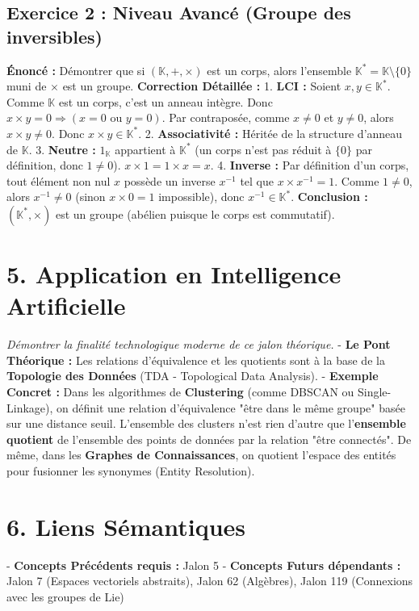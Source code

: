 \documentclass{report}
\begin{document}
\subsection*{Exercice 2 : Niveau Avancé (Groupe des inversibles)}
\textbf{Énoncé :} Démontrer que si $(\mathbb{K}, +, \times)$ est un corps, alors l'ensemble $\mathbb{K}^* = \mathbb{K} \setminus \{0\}$ muni de $\times$ est un groupe.
\textbf{Correction Détaillée :}
1. \textbf{LCI :} Soient $x, y \in \mathbb{K}^*$. Comme $\mathbb{K}$ est un corps, c'est un anneau intègre. Donc $x \times y = 0 \Rightarrow (x = 0 \text{ ou } y = 0)$. Par contraposée, comme $x \neq 0$ et $y \neq 0$, alors $x \times y \neq 0$. Donc $x \times y \in \mathbb{K}^*$.
2. \textbf{Associativité :} Héritée de la structure d'anneau de $\mathbb{K}$.
3. \textbf{Neutre :} $1_{\mathbb{K}}$ appartient à $\mathbb{K}^*$ (un corps n'est pas réduit à $\{0\}$ par définition, donc $1 \neq 0$). $x \times 1 = 1 \times x = x$.
4. \textbf{Inverse :} Par définition d'un corps, tout élément non nul $x$ possède un inverse $x^{-1}$ tel que $x \times x^{-1} = 1$. Comme $1 \neq 0$, alors $x^{-1} \neq 0$ (sinon $x \times 0 = 1$ impossible), donc $x^{-1} \in \mathbb{K}^*$.
\textbf{Conclusion :} $(\mathbb{K}^*, \times)$ est un groupe (abélien puisque le corps est commutatif).

\section*{5. Application en Intelligence Artificielle}
\textit{Démontrer la finalité technologique moderne de ce jalon théorique.}
- \textbf{Le Pont Théorique :} Les relations d'équivalence et les quotients sont à la base de la \textbf{Topologie des Données} (TDA - Topological Data Analysis).
- \textbf{Exemple Concret :} Dans les algorithmes de \textbf{Clustering} (comme DBSCAN ou Single-Linkage), on définit une relation d'équivalence "être dans le même groupe" basée sur une distance seuil. L'ensemble des clusters n'est rien d'autre que l'\textbf{ensemble quotient} de l'ensemble des points de données par la relation "être connectés". De même, dans les \textbf{Graphes de Connaissances}, on quotient l'espace des entités pour fusionner les synonymes (Entity Resolution).

\section*{6. Liens Sémantiques}
- \textbf{Concepts Précédents requis :} Jalon 5
- \textbf{Concepts Futurs dépendants :} Jalon 7 (Espaces vectoriels abstraits), Jalon 62 (Algèbres), Jalon 119 (Connexions avec les groupes de Lie)
\end{document}
